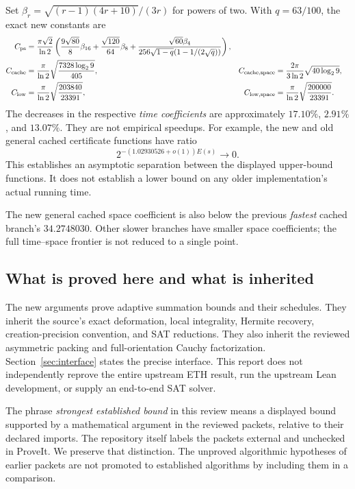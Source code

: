 Set $\beta_r=\sqrt{(r-1)(4r+10)}/(3r)$ for powers of two.
With $q=63/100$, the exact new constants are
\begin{align}
C_{\rm ps}
 &=\frac{\pi\sqrt2}{\ln2}
       \left(\frac{9\sqrt{80}}8\beta_{16}
       +\frac{\sqrt{120}}{64}\beta_8
       +\frac{\sqrt{60}\beta_4}{256\sqrt{1-q}(1-1/(2\sqrt q))}\right),
       \label{eq:overview-ps}\\
C_{\rm cache}
 &=\frac{\pi}{\ln2}
       \sqrt{\frac{7328\log_2 9}{405}},
&
C_{\rm cache,space}
 &=\frac{2\pi}{3\ln2}\sqrt{40\log_2 9},
       \label{eq:overview-cache}\\
C_{\rm low}
 &=\frac{\pi}{\ln2}\sqrt{\frac{203840}{23391}},
&
C_{\rm low,space}
 &=\frac{\pi}{\ln2}\sqrt{\frac{200000}{23391}}.
       \label{eq:overview-low}
\end{align}
The decreases in the respective \emph{time coefficients} are approximately
$17.10\%$, $2.91\%$, and $13.07\%$. They are not empirical speedups.
For example, the new and old general cached certificate functions have
ratio
\[
 2^{-(1.02930526+o(1))E(s)}\longrightarrow0.
\]
This establishes an asymptotic separation between the displayed upper-bound
functions. It does not establish a lower bound on any older implementation's
actual running time.

The new general cached space coefficient is also below the previous
\emph{fastest} cached branch's $34.2748030$. Other slower branches have
smaller space coefficients; the full time--space frontier is not reduced
to a single point.

\subsection{What is proved here and what is inherited}

The new arguments prove adaptive summation bounds and their schedules.
They inherit the source's exact deformation, local integrality, Hermite
recovery, creation-precision convention, and SAT reductions. They also
inherit the reviewed asymmetric packing and full-orientation Cauchy
factorization. Section~\ref{sec:interface} states the precise interface.
This report does not independently reprove the entire upstream ETH result,
run the upstream Lean development, or supply an end-to-end SAT solver.

The phrase \emph{strongest established bound} in this review means a
displayed bound supported by a mathematical argument in the reviewed
packets, relative to their declared imports. The repository itself labels
the packets external and unchecked in ProveIt. We preserve that distinction.
The unproved algorithmic hypotheses of earlier packets are not promoted
to established algorithms by including them in a comparison.

